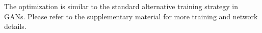 \documentclass[10pt,twocolumn,letterpaper]{article}
\begin{document}
The optimization is similar to the standard alternative training strategy in GANs. Please refer to the supplementary material for more training and network details.









%			
\end{document}
